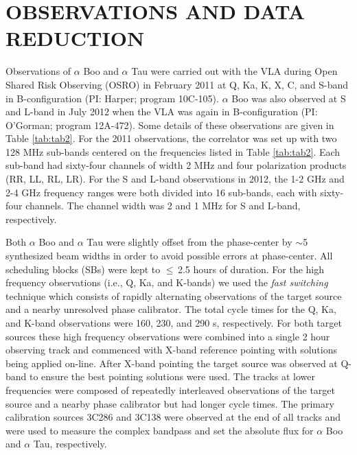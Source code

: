 \documentclass[iop]{emulateapj}
\begin{document}
\section{OBSERVATIONS AND DATA REDUCTION}

Observations of $\alpha$ Boo and $\alpha$ Tau were carried out with the VLA during Open Shared Risk Observing (OSRO) in February 2011 at Q, Ka, K, X, C, and S-band in B-configuration (PI: Harper; program 10C-105). $\alpha$ Boo was also observed at S and L-band in July 2012 when the VLA was again in B-configuration (PI: O'Gorman; program 12A-472). Some details of these observations are given in Table \ref{tab:tab2}. For the 2011 observations, the correlator was set up with two 128 MHz sub-bands centered on the frequencies listed in Table \ref{tab:tab2}. Each sub-band had sixty-four channels of width 2 MHz and four polarization products (RR, LL, RL, LR). For the S and L-band observations in 2012, the 1-2 GHz and 2-4 GHz frequency ranges were both divided into 16 sub-bands, each with sixty-four channels. The channel width was 2 and 1 MHz for S and L-band, respectively.

Both $\alpha$ Boo and $\alpha$ Tau were slightly offset from the phase-center by $\sim$5 synthesized beam widths in order to avoid possible errors at phase-center. All scheduling blocks (SBs) were kept to $\le$\,2.5 hours of duration. For the high frequency observations (i.e., Q, Ka, and K-bands) we used the \textit{fast switching} technique which consists of rapidly alternating observations of the target source and a nearby unresolved phase calibrator. The total cycle times for the Q, Ka, and K-band observations were 160, 230, and 290 s, respectively. For both target sources these high frequency observations were combined into a single 2 hour observing track and commenced with X-band reference pointing with solutions being applied on-line. After X-band pointing the target source was observed at Q-band to ensure the best pointing solutions were used. The tracks at lower frequencies were composed of repeatedly interleaved observations of the target source and a nearby phase calibrator but had longer cycle times. The primary calibration sources 3C286 and 3C138 were observed at the end of all tracks and were used to measure the complex bandpass and set the absolute flux for $\alpha$ Boo and $\alpha$ Tau, respectively.  
\end{document}
